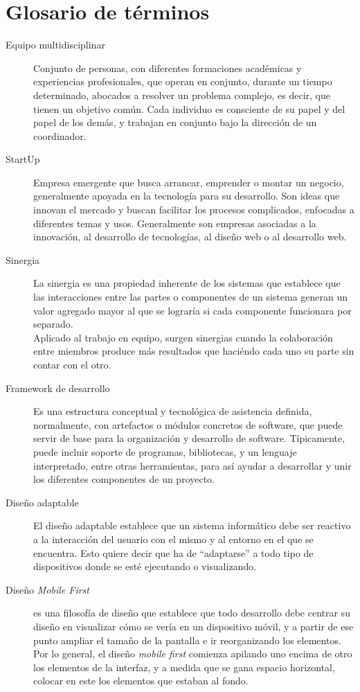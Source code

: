 \chapter{Glosario de términos}

\begin{description}
    \item[Equipo multidisciplinar] Conjunto de personas, con diferentes formaciones académicas y experiencias profesionales, que operan en conjunto, durante un tiempo determinado, abocados a resolver un problema complejo, es decir, que tienen un objetivo común. Cada individuo es consciente de su papel y del papel de los demás, y trabajan en conjunto bajo la dirección de un coordinador.
    \item[StartUp] Empresa emergente que busca arrancar, emprender o montar un negocio, generalmente apoyada en la tecnología para su desarrollo. Son ideas que innovan el mercado y buscan facilitar los procesos complicados, enfocadas a diferentes temas y usos. Generalmente son empresas asociadas a la innovación, al desarrollo de tecnologías, al diseño web o al desarrollo web.
    \item[Sinergia] La sinergia es una propiedad inherente de los sistemas que establece que las interacciones entre las partes o componentes de un sistema generan un valor agregado mayor al que se lograría si cada componente funcionara por separado.\\
    Aplicado al trabajo en equipo, surgen sinergias cuando la colaboración entre miembros produce más resultados que haciéndo cada uno su parte sin contar con el otro.
    \item[Framework de desarrollo \cite{framework}] Es una estructura conceptual y tecnológica de asistencia definida, normalmente, con artefactos o módulos concretos de software, que puede servir de base para la organización y desarrollo de software. Típicamente, puede incluir soporte de programas, bibliotecas, y un lenguaje interpretado, entre otras herramientas, para así ayudar a desarrollar y unir los diferentes componentes de un proyecto.
    \item[Diseño adaptable] El diseño adaptable establece que un sistema informático debe ser reactivo a la interacción del usuario con el mismo y al entorno en el que se encuentra. Esto quiere decir que ha de ``adaptarse'' a todo tipo de dispositivos donde se esté ejecutando o visualizando.
    \item[Diseño \textit{Mobile First}] es una filosofía de diseño que establece que todo desarrollo debe centrar su diseño en visualizar cómo se vería en un dispositivo móvil, y a partir de ese punto ampliar el tamaño de la pantalla e ir reorganizando los elementos.\\
    Por lo general, el diseño \textit{mobile first} comienza apilando uno encima de otro los elementos de la interfaz, y a medida que se gana espacio horizontal, colocar en este los elementos que estaban al fondo.
\end{description}
